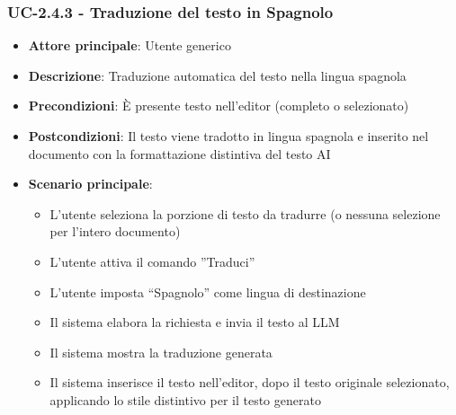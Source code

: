 \documentclass[11pt,a4paper]{article}
\begin{document}
\subsubsection{UC-2.4.3 - Traduzione del testo in Spagnolo}
\begin{itemize}
    \item \textbf{Attore principale}: Utente generico
    \item \textbf{Descrizione}: Traduzione automatica del testo nella lingua spagnola
    \item \textbf{Precondizioni}: È presente testo nell’editor (completo o selezionato)
    \item \textbf{Postcondizioni}: Il testo viene tradotto in lingua spagnola e inserito nel documento con la formattazione distintiva del testo AI
    \item \textbf{Scenario principale}:
    \begin{itemize}
        \item L’utente seleziona la porzione di testo da tradurre (o nessuna selezione per l'intero documento)
        \item L’utente attiva il comando ”Traduci”
        \item L’utente imposta “Spagnolo” come lingua di destinazione
        \item Il sistema elabora la richiesta e invia il testo al LLM
        \item Il sistema mostra la traduzione generata
        \item Il sistema inserisce il testo nell'editor, dopo il testo originale selezionato, applicando lo stile distintivo per il testo generato
    \end{itemize}
\end{itemize}
\end{document}
